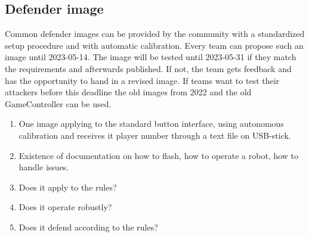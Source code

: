 \subsection{Defender image}
\label{sec:Challenge_image}
Common defender images can be provided by the community with a standardized setup procedure and with automatic calibration. Every team can propose such an image until 2023-05-14. The image will be tested until 2023-05-31 if they match the requirements and afterwards published. If not, the team gets feedback and has the opportunity to hand in a revised image. If teams want to test their attackers before this deadline the old images from 2022 and the old GameController can be used.

\begin{enumerate}
	\item One image applying to the standard button interface, using autonomous calibration and receives it player number through a text file on USB-stick.
	\item Existence of documentation on how to flash, how to operate a robot, how to handle issues.
	\item Does it apply to the rules?
	\item Does it operate robustly?
	\item Does it defend according to the rules?
\end{enumerate}
